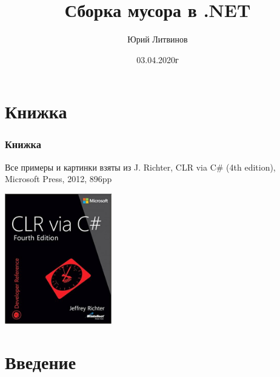 \documentclass[xetex,mathserif,serif]{beamer}
\title{Сборка мусора в .NET}
\author{Юрий Литвинов}
\date{03.04.2020г}
\begin{document}
    \frame{\titlepage}
    
    \section{Книжка}

    \begin{frame}
        \frametitle{Книжка}
        Все примеры и картинки взяты из J. Richter, CLR via C\# (4th edition), Microsoft Press, 2012, 896pp
        \begin{center}
            \includegraphics[width=0.35\textwidth]{richterCover.png}
        \end{center}
    \end{frame}

    \section{Введение}
\end{document}
